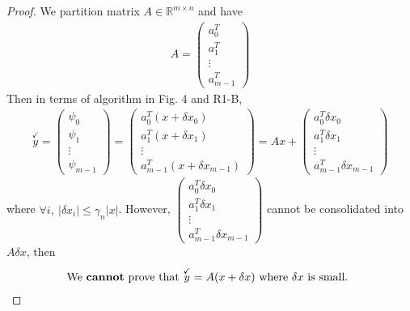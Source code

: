 \documentclass[11pt,a4paper]{article}
\begin{document}
\newpage
\setcounter{section}{24}
\section{}
\newcommand{\ycheck}{\overset{\checkmark}{y}}
\begin{proof}
    We partition matrix $A \in \mathbb{R}^{m\times n}$ and have
    \begin{align}
        A = \left(\begin{array}{c}a_0^T \\ a_1^T \\\vdots\\a_{m-1}^T \end{array}\right)
    \end{align}
    Then in terms of algorithm in Fig. 4 and R1-B, 
    \begin{align}
        \ycheck 
        = \left(\begin{array}{c}\psi_0 \\ \psi_1 \\\vdots\\\psi_{m-1} \end{array}\right) 
        = \left(\begin{array}{c}a_0^T(x+\delta x_0) \\ a_1^T(x+\delta x_1)
                \\\vdots\\a_{m-1}^T(x+\delta x_{m-1}) \end{array}\right) 
        = A x + \left(\begin{array}{c}a_0^T \delta x_0 \\ a_1^T\delta x_1
                \\\vdots\\a_{m-1}^T\delta x_{m-1} \end{array}\right)
    \end{align}
    where $\forall i,\ |\delta x_i| \leq \gamma_n |x|$. However, 
       $\left(\begin{array}{c}a_0^T \delta x_0 \\ a_1^T\delta x_1
                \\\vdots\\a_{m-1}^T\delta x_{m-1} \end{array}\right)$
        cannot be consolidated into $A \delta x$, then 
    \begin{align}
        \text{We \textbf{cannot} prove that } \ycheck = A (x+\delta x) 
        \text{ where } \delta x \text{ is small. } 
    \end{align}
\end{proof}
\end{document}
